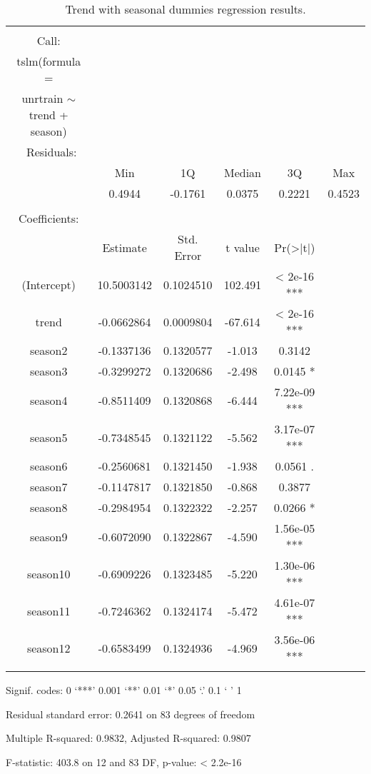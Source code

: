 \documentclass{article}
\begin{document}
\begin{table}[!htbp] \centering 
\begin{threeparttable}
  \caption{Trend with seasonal dummies regression results.} 
  \label{} 
\begin{tabular}{@{\extracolsep{5pt}} cccccc} 
 \toprule
\\[-1.8ex]\hline 
\hline \\[-1.8ex] 
Call: \\
tslm(formula = \\
unrtrain $\sim$ trend + season) \\
\midrule\
Residuals: \\
 & Min   &    1Q  & Median  &     3Q  &    Max \\
& 0.4944 & -0.1761 &  0.0375 &   0.2221  & 0.4523 \\
\\
Coefficients: \\
     &         Estimate & Std. Error & t value & Pr(>|t|)    \\
(Intercept) & 10.5003142 &  0.1024510 & 102.491 &  < 2e-16 *** \\
trend    &    -0.0662864  & 0.0009804 & -67.614  & < 2e-16 *** \\
season2  &    -0.1337136  & 0.1320577  & -1.013   & 0.3142    \\
season3   &   -0.3299272  & 0.1320686  & -2.498 &   0.0145 * \\ 
season4  &    -0.8511409  & 0.1320868  & -6.444 & 7.22e-09 *** \\
season5  &    -0.7348545 &   0.1321122 &  -5.562 & 3.17e-07 *** \\
season6  &    -0.2560681 &  0.1321450 &  -1.938  &  0.0561 .  \\
season7   &   -0.1147817  & 0.1321850  & -0.868  &  0.3877    \\
season8   &   -0.2984954 &  0.1322322  & -2.257  &  0.0266 * \\  
season9  &    -0.6072090  & 0.1322867  & -4.590 & 1.56e-05 *** \\
season10  &   -0.6909226 &  0.1323485  & -5.220 & 1.30e-06 *** \\
season11  &   -0.7246362 &  0.1324174  & -5.472 & 4.61e-07 *** \\
season12  &   -0.6583499 &  0.1324936  & -4.969 & 3.56e-06 *** \\
\hline \\[-1.8ex] 
\bottomrule
 \end{tabular}
 \begin{tablenotes}
      \small
      \item Signif. codes:  0 ‘***’ 0.001 ‘**’ 0.01 ‘*’ 0.05 ‘.’ 0.1 ‘ ’ 1
\item Residual standard error: 0.2641 on 83 degrees of freedom
\item Multiple R-squared:  0.9832,	Adjusted R-squared:  0.9807  
\item F-statistic: 403.8 on 12 and 83 DF,  p-value: < 2.2e-16
\end{tablenotes}
  \end{threeparttable}
\end{table} 
\end{document}
